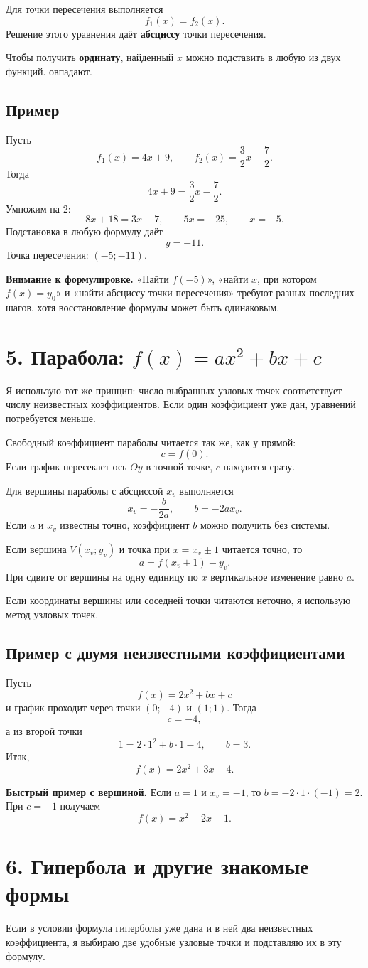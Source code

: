 \documentclass[a4paper,12pt]{article}
\newcommand{\heading}[1]{\section*{\color{darkaccent}#1}}
\newcommand{\subheading}[1]{\subsection*{\color{darkaccent}#1}}
\newcommand{\checkitem}[1]{%
  \par\noindent
  \makebox[7mm][l]{\raisebox{0.15ex}{$\square$}}%
  \begin{minipage}[t]{\dimexpr\linewidth-7mm\relax}
    #1
  \end{minipage}\par\vspace{2mm}
}
\newcommand{\key}[1]{\textbf{\color{darkaccent}#1}}
\newcommand{\thinrule}{\par\vspace{1mm}{\color{accent!55}\hrule height 0.5pt}\vspace{3mm}}
\begin{document}
\checkitem{Для точки пересечения выполняется
\[
f_1(x)=f_2(x).
\]
Решение этого уравнения даёт \key{абсциссу} точки пересечения.}

\checkitem{Чтобы получить \key{ординату}, найденный $x$ можно подставить в любую из двух функций. овпадают.}

\subheading{Пример}
Пусть
\[
f_1(x)=4x+9,
\qquad
f_2(x)=\frac32x-\frac72.
\]
Тогда
\[
4x+9=\frac32x-\frac72.
\]
Умножим на $2$:
\[
8x+18=3x-7,
\qquad 5x=-25,
\qquad x=-5.
\]
Подстановка в любую формулу даёт
\[
y=-11.
\]
Точка пересечения: $(-5;-11)$.

\thinrule
\textbf{Внимание к формулировке.} «Найти $f(-5)$», «найти $x$, при котором $f(x)=y_0$» и «найти абсциссу точки пересечения» требуют разных последних шагов, хотя восстановление формулы может быть одинаковым.

\clearpage
\heading{5. Парабола: $f(x)=ax^2+bx+c$}

\checkitem{Я использую тот же принцип: число выбранных узловых точек соответствует числу неизвестных коэффициентов. Если один коэффициент уже дан, уравнений потребуется меньше.}

\checkitem{Свободный коэффициент параболы читается так же, как у прямой:
\[
c=f(0).
\]
Если график пересекает ось $Oy$ в точной точке, $c$ находится сразу.}

\checkitem{Для вершины параболы с абсциссой $x_v$ выполняется
\[
x_v=-\frac{b}{2a},
\qquad
b=-2ax_v.
\]
Если $a$ и $x_v$ известны точно, коэффициент $b$ можно получить без системы.}

\checkitem{Если вершина $V(x_v;y_v)$ и точка при $x=x_v\pm1$ читается точно, то
\[
a=f(x_v\pm1)-y_v.
\]
При сдвиге от вершины на одну единицу по $x$ вертикальное изменение равно $a$.}

\checkitem{Если координаты вершины или соседней точки читаются неточно, я использую метод узловых точек.}

\subheading{Пример с двумя неизвестными коэффициентами}
Пусть
\[
f(x)=2x^2+bx+c
\]
и график проходит через точки $(0;-4)$ и $(1;1)$. Тогда
\[
c=-4,
\]
а из второй точки
\[
1=2\cdot1^2+b\cdot1-4,
\qquad b=3.
\]
Итак,
\[
f(x)=2x^2+3x-4.
\]

\textbf{Быстрый пример с вершиной.} Если $a=1$ и $x_v=-1$, то $b=-2\cdot1\cdot(-1)=2$. При $c=-1$ получаем
\[
f(x)=x^2+2x-1.
\]

\clearpage
\heading{6. Гипербола и другие знакомые формы}

\checkitem{Если в условии формула гиперболы уже дана и в ней два неизвестных коэффициента, я выбираю две удобные узловые точки и подставляю их в эту формулу.}
\end{document}
